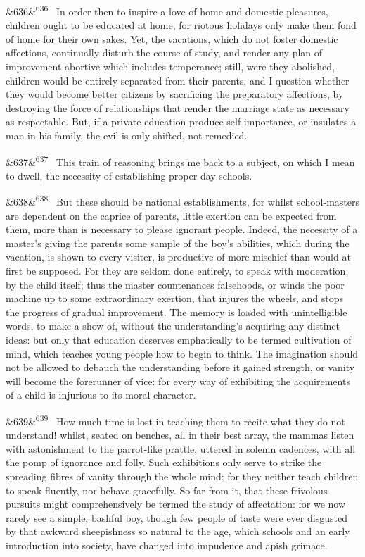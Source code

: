 \documentclass[12pt]{article}
\newcommand{\para}[1][]{\par\noindent\ifx&#1&\else\textsuperscript{\footnotesize #1}~\fi}
\begin{document}
\para[636] In order then to inspire a love of home and domestic pleasures, children ought to be educated at home, for riotous holidays only make them fond of home for their own sakes. Yet, the vacations, which do not foster domestic affections, continually disturb the course of study, and render any plan of improvement abortive which includes temperance; still, were they abolished, children would be entirely separated from their parents, and I question whether they would become better citizens by sacrificing the preparatory affections, by destroying the force of relationships that render the marriage state as necessary as respectable. But, if a private education produce self-importance, or insulates a man in his family, the evil is only shifted, not remedied.

\para[637] This train of reasoning brings me back to a subject, on which I mean to dwell, the necessity of establishing proper day-schools.

\para[638] But these should be national establishments, for whilst school-masters are dependent on the caprice of parents, little exertion can be expected from them, more than is necessary to please ignorant people. Indeed, the necessity of a master's giving the parents some sample of the boy's abilities, which during the vacation, is shown to every visiter, is productive of more mischief than would at first be supposed. For they are seldom done entirely, to speak with moderation, by the child itself; thus the master countenances falsehoods, or winds the poor machine up to some extraordinary exertion, that injures the wheels, and stops the progress of gradual improvement. The memory is loaded with unintelligible words, to make a show of, without the understanding's acquiring any distinct ideas: but only that education deserves emphatically to be termed cultivation of mind, which teaches young people how to begin to think. The imagination should not be allowed to debauch the understanding before it gained strength, or vanity will become the forerunner of vice: for every way of exhibiting the acquirements of a child is injurious to its moral character.

\para[639] How much time is lost in teaching them to recite what they do not understand! whilst, seated on benches, all in their best array, the mammas listen with astonishment to the parrot-like prattle, uttered in solemn cadences, with all the pomp of ignorance and folly. Such exhibitions only serve to strike the spreading fibres of vanity through the whole mind; for they neither teach children to speak fluently, nor behave gracefully. So far from it, that these frivolous pursuits might comprehensively be termed the study of affectation: for we now rarely see a simple, bashful boy, though few people of taste were ever disgusted by that awkward sheepishness so natural to the age, which schools and an early introduction into society, have changed into impudence and apish grimace.
\end{document}
